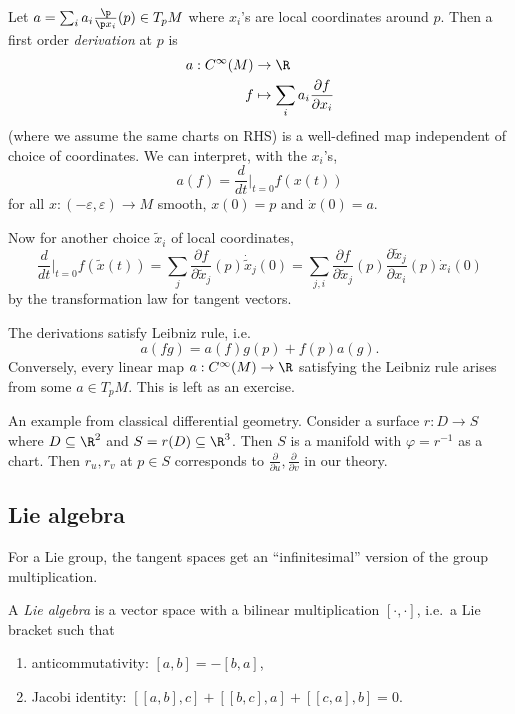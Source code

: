 \documentclass[a4paper]{article}
\begin{document}
Let \(a = \sum_i a_i \frac{\p}{\p x_i} (p) \in T_pM\) where \(x_i\)'s are local coordinates around \(p\). Then a first order \emph{derivation} at \(p\) is
\begin{align*}
  a: C^\infty(M) &\to \R \\
  f &\mapsto \sum_i a_i \frac{\partial f}{\partial x_i} 
\end{align*}
(where we assume the same charts on RHS) is a well-defined map independent of choice of coordinates. We can interpret, with the \(x_i\)'s,
\[
  a(f) = \frac{d}{dt} \Big|_{t = 0} f(x(t))
\]
for all \(x: (-\varepsilon, \varepsilon) \to M\) smooth, \(x(0) = p\) and \(\dot x(0) = a\).

Now for another choice \(\tilde x_i\) of local coordinates,
\[
  \frac{d}{dt} \Big|_{t = 0} f(\tilde x(t))
  = \sum_j \frac{\partial f}{\partial \tilde x_j} (p) \dot{\tilde x}_j(0)
  = \sum_{j, i} \frac{\partial f}{\partial \tilde x_j}(p) \frac{\partial \tilde x_j}{\partial x_i}(p) \dot x_i(0)
\]
by the transformation law for tangent vectors.%

The derivations satisfy Leibniz rule, i.e.\
\[
  a(fg) = a(f)g(p) + f(p)a(g).
\]
Conversely, every linear map \(a: C^\infty(M) \to \R\) satisfying the Leibniz rule arises from some \(a \in T_pM\). This is left as an exercise.

\begin{eg}
  An example from classical differential geometry. Consider a surface \(r: D \to S\) where \(D \subseteq \R^2\) and \(S = r(D) \subseteq \R^3\). Then \(S\) is a manifold with \(\varphi = r^{-1}\) as a chart. Then \(r_u, r_v\) at \(p \in S\) corresponds to \(\frac{\partial}{\partial u}, \frac{\partial}{\partial v}\) in our theory.
\end{eg}

\subsection{Lie algebra}

For a Lie group, the tangent spaces get an ``infinitesimal'' version of the group multiplication.

\begin{definition}
  A \emph{Lie algebra} is a vector space with a bilinear multiplication \([\cdot, \cdot]\), i.e.\ a Lie bracket such that
  \begin{enumerate}
  \item anticommutativity: \([a, b] = -[b, a]\),
  \item Jacobi identity: \([[a, b], c] + [[b, c], a] + [[c, a], b] = 0\).
  \end{enumerate}
\end{definition}
\end{document}
